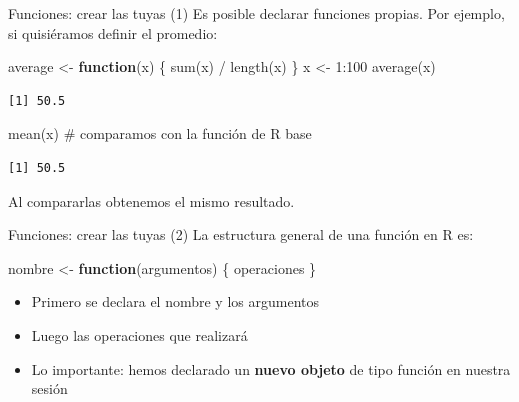 \documentclass[
  9pt,
  ignorenonframetext,
]{beamer}
\newenvironment{Shaded}{\begin{snugshade}}{\end{snugshade}}
\newcommand{\CommentTok}[1]{\textcolor[rgb]{0.37,0.37,0.37}{#1}}
\newcommand{\ControlFlowTok}[1]{\textcolor[rgb]{0.00,0.23,0.31}{\textbf{#1}}}
\newcommand{\DecValTok}[1]{\textcolor[rgb]{0.68,0.00,0.00}{#1}}
\newcommand{\FunctionTok}[1]{\textcolor[rgb]{0.28,0.35,0.67}{#1}}
\newcommand{\NormalTok}[1]{\textcolor[rgb]{0.00,0.23,0.31}{#1}}
\newcommand{\OtherTok}[1]{\textcolor[rgb]{0.00,0.23,0.31}{#1}}
\newcommand{\SpecialCharTok}[1]{\textcolor[rgb]{0.37,0.37,0.37}{#1}}
\providecommand{\tightlist}{%
  \setlength{\itemsep}{0pt}\setlength{\parskip}{0pt}}\usepackage{longtable,booktabs,array}
\begin{document}
\begin{frame}[fragile]{Funciones: crear las tuyas (1)}
\label{funciones-crear-las-tuyas-1}
Es posible declarar funciones propias. Por ejemplo, si quisiéramos
definir el promedio:

\begin{Shaded}
\begin{Highlighting}[]
\NormalTok{average }\OtherTok{\textless{}{-}} \ControlFlowTok{function}\NormalTok{(x) \{ }\FunctionTok{sum}\NormalTok{(x) }\SpecialCharTok{/} \FunctionTok{length}\NormalTok{(x) \}}
\NormalTok{x }\OtherTok{\textless{}{-}} \DecValTok{1}\SpecialCharTok{:}\DecValTok{100}
\FunctionTok{average}\NormalTok{(x)}
\end{Highlighting}
\end{Shaded}

\begin{verbatim}
[1] 50.5
\end{verbatim}

\begin{Shaded}
\begin{Highlighting}[]
\FunctionTok{mean}\NormalTok{(x)       }\CommentTok{\# comparamos con la función de R base}
\end{Highlighting}
\end{Shaded}

\begin{verbatim}
[1] 50.5
\end{verbatim}

Al compararlas obtenemos el mismo resultado.
\end{frame}

\begin{frame}[fragile]{Funciones: crear las tuyas (2)}
\label{funciones-crear-las-tuyas-2}
La estructura general de una función en R es:

\begin{Shaded}
\begin{Highlighting}[]
\NormalTok{nombre }\OtherTok{\textless{}{-}} \ControlFlowTok{function}\NormalTok{(argumentos) \{}
\NormalTok{  operaciones}
\NormalTok{\}}
\end{Highlighting}
\end{Shaded}

\begin{itemize}
\tightlist
\item
  Primero se declara el nombre y los argumentos
\item
  Luego las operaciones que realizará
\item
  Lo importante: hemos declarado un \textbf{nuevo objeto} de tipo
  función en nuestra sesión
\end{itemize}
\end{frame}
\end{document}
